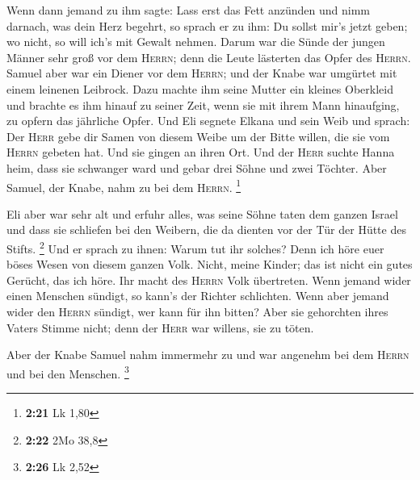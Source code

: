  Wenn dann jemand zu ihm sagte: Lass erst das Fett
anzünden und nimm darnach, was dein Herz begehrt, so sprach er zu ihm:
Du sollst mir's jetzt geben; wo nicht, so will ich's mit Gewalt nehmen.
 Darum war die Sünde der jungen Männer sehr groß vor dem
\textsc{Herrn}; denn die Leute lästerten das Opfer des \textsc{Herrn}.
 Samuel aber war ein Diener vor dem \textsc{Herrn}; und
der Knabe war umgürtet mit einem leinenen Leibrock.  Dazu
machte ihm seine Mutter ein kleines Oberkleid und brachte es ihm hinauf
zu seiner Zeit, wenn sie mit ihrem Mann hinaufging, zu opfern das
jährliche Opfer.  Und Eli segnete Elkana und sein Weib
und sprach: Der \textsc{Herr} gebe dir Samen von diesem Weibe um der
Bitte willen, die sie vom \textsc{Herrn} gebeten hat. Und sie gingen an
ihren Ort.  Und der \textsc{Herr} suchte Hanna heim, dass
sie schwanger ward und gebar drei Söhne und zwei Töchter. Aber Samuel,
der Knabe, nahm zu bei dem \textsc{Herrn}. \footnote{\textbf{2:21} Lk
  1,80}

 Eli aber war sehr alt und erfuhr alles, was seine Söhne
taten dem ganzen Israel und dass sie schliefen bei den Weibern, die da
dienten vor der Tür der Hütte des Stifts. \footnote{\textbf{2:22} 2Mo
  38,8}  Und er sprach zu ihnen: Warum tut ihr solches?
Denn ich höre euer böses Wesen von diesem ganzen Volk. 
Nicht, meine Kinder; das ist nicht ein gutes Gerücht, das ich höre. Ihr
macht des \textsc{Herrn} Volk übertreten.  Wenn jemand
wider einen Menschen sündigt, so kann's der Richter schlichten. Wenn
aber jemand wider den \textsc{Herrn} sündigt, wer kann für ihn bitten?
Aber sie gehorchten ihres Vaters Stimme nicht; denn der \textsc{Herr}
war willens, sie zu töten.

 Aber der Knabe Samuel nahm immermehr zu und war angenehm
bei dem \textsc{Herrn} und bei den Menschen. \footnote{\textbf{2:26} Lk
  2,52}

